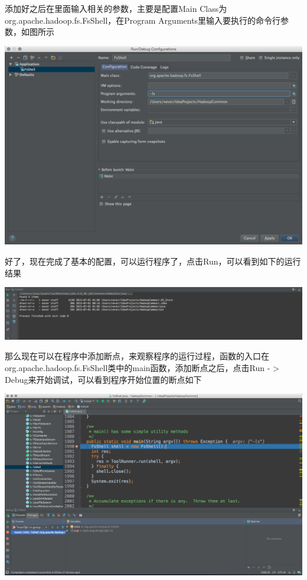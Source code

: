 添加好之后在里面输入相关的参数，主要是配置Main Class为org.apache.hadoop.fs.FsShell，在Program Arguments里输入要执行的命令行参数，如图所示

\includegraphics[width=\textwidth]{image/env/cr31.png}

好了，现在完成了基本的配置，可以运行程序了，点击Run，可以看到如下的运行结果

\includegraphics[width=\textwidth]{image/env/cr32.png}

那么现在可以在程序中添加断点，来观察程序的运行过程，函数的入口在org.apache.hadoop.fs.FsShell类中的main函数，添加断点之后，点击Run - > Debug来开始调试，可以看到程序开始位置的断点如下

\includegraphics[width=\textwidth]{image/env/cr33.png}

